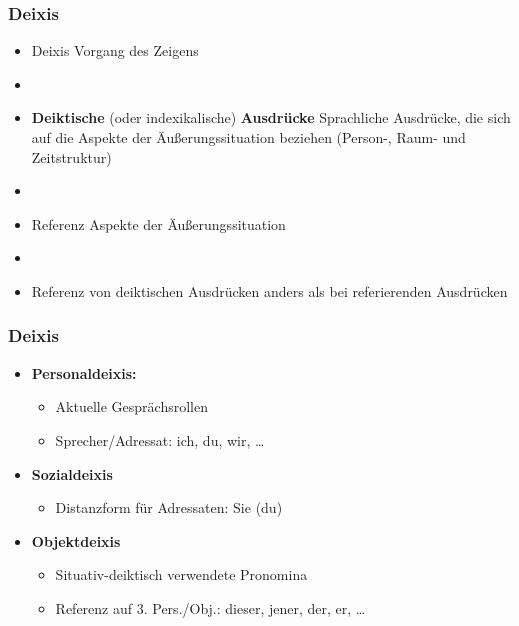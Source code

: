 \begin{frame}
\frametitle{Deixis}

\begin{itemize}
	\item Deixis \ras Vorgang des Zeigens
	\item[]
	\item \textbf{Deiktische} (oder indexikalische) \textbf{Ausdrücke} \ras Sprachliche Ausdrücke, die sich auf die Aspekte der Äu\ss{}erungssituation beziehen (Person-, Raum- und Zeitstruktur)
	\item[]
	\item Referenz \ras Aspekte der Äu\ss{}erungssituation
	\item[]
	\item Referenz von deiktischen Ausdrücken anders als bei referierenden Ausdrücken
\end{itemize}

\end{frame}



\begin{frame}
\frametitle{Deixis}

\begin{itemize}
	\item \textbf{Personaldeixis:} 
	
	\begin{itemize}
		\item Aktuelle Gesprächsrollen
		\item Sprecher/Adressat: ich, du, wir, \dots
	\end{itemize}
	
	\item \textbf{Sozialdeixis}
	
	\begin{itemize}
		\item Distanzform für Adressaten: Sie (\vs du)
	\end{itemize}
	
	\item \textbf{Objektdeixis}
	
	\begin{itemize}
		\item Situativ-deiktisch verwendete Pronomina
		\item Referenz auf 3. Pers./Obj.: dieser, jener, der, er, \dots
	\end{itemize}
	
\end{itemize}

\end{frame}


